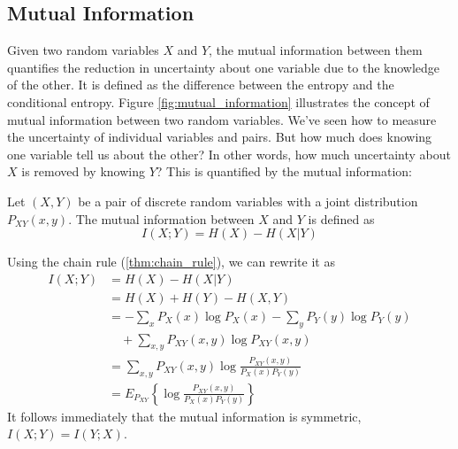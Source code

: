\subsection{Mutual Information}
Given two random variables $X$ and $Y$, the mutual information between them quantifies the reduction in uncertainty about one variable due to the knowledge of the other. It is defined as the difference between the entropy and the conditional entropy. Figure \ref{fig:mutual_information} illustrates the concept of mutual information between two random variables. We've seen how to measure the uncertainty of individual variables and pairs. But how much does knowing one variable tell us about the other? In other words, how much uncertainty about $X$ is removed by knowing $Y$? This is quantified by the mutual information:

\begin{definition}\label{def:mutual_information}
    Let $(X,Y)$ be a pair of discrete random variables with a joint distribution $P_{XY}(x,y)$. The mutual information between $X$ and $Y$ is defined as
    \begin{equation}
        I(X;Y) = H(X) - H(X|Y)
    \end{equation}
\end{definition}
\noindent Using the chain rule (\ref{thm:chain_rule}), we can rewrite it as
\begin{align}
    I(X;Y) & = H(X) - H(X|Y) \nonumber                                           \\
           & = H(X) + H(Y) - H(X,Y)                                              \\
           & = -\sum_x P_X(x)\log P_X(x) - \sum_y P_Y(y)\log P_Y(y) \nonumber    \\
           & \quad + \sum_{x,y} P_{XY}(x,y)\log P_{XY}(x,y)                      \\
           & = \sum_{x,y} P_{XY}(x,y)\log \frac{P_{XY}(x,y)}{P_X(x)P_Y(y)}       \\
           & = E_{P_{XY}} \left\{ \log \frac{P_{XY}(x,y)}{P_X(x)P_Y(y)} \right\}
\end{align}
It follows immediately that the mutual information is symmetric, $I(X;Y) = I(Y;X)$.

